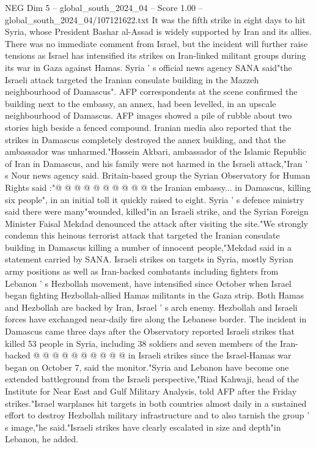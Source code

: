 \begin{textsample}{NEG Dim 5 – global\_south\_2024\_04 – Score 1.00 – global\_south\_2024\_04/107121622.txt}  \label{ex:f5_neg_114}
It was the fifth strike in eight days to hit Syria, whose President Bashar al-Assad is widely supported by Iran and its allies.
There was no immediate comment from Israel, but the incident will further raise tensions as Israel has intensified its strikes on Iran-linked militant groups during its war in Gaza against Hamas.
Syria ' s official news agency SANA said"the Israeli attack targeted the Iranian consulate building in the Mazzeh neighbourhood of Damascus".
AFP correspondents at the scene confirmed the building next to the embassy, an annex, had been levelled, in an upscale neighbourhood of Damascus.
AFP images showed a pile of rubble about two stories high beside a fenced compound.
Iranian media also reported that the strikes in Damascus completely destroyed the annex building, and that the ambassador was unharmed."Hossein Akbari, ambassador of the Islamic Republic of Iran in Damascus, and his family were not harmed in the Israeli attack,"Iran ' s Nour news agency said.
Britain-based group the Syrian Observatory for Human Rights said :"@ @ @ @ @ @ @ @ @ @ the Iranian embassy... in Damascus, killing six people", in an initial toll it quickly raised to eight.
Syria ' s defence ministry said there were many"wounded, killed"in an Israeli strike, and the Syrian Foreign Minister Faisal Mekdad denounced the attack after visiting the site."We strongly condemn this heinous terrorist attack that targeted the Iranian consulate building in Damascus killing a number of innocent people,"Mekdad said in a statement carried by SANA.
Israeli strikes on targets in Syria, mostly Syrian army positions as well as Iran-backed combatants including fighters from Lebanon ' s Hezbollah movement, have intensified since October when Israel began fighting Hezbollah-allied Hamas militants in the Gaza strip.
Both Hamas and Hezbollah are backed by Iran, Israel ' s arch enemy.
Hezbollah and Israeli forces have exchanged near-daily fire along the Lebanese border.
The incident in Damascus came three days after the Observatory reported Israeli strikes that killed 53 people in Syria, including 38 soldiers and seven members of the Iran-backed @ @ @ @ @ @ @ @ @ @ in Israeli strikes since the Israel-Hamas war began on October 7, said the monitor."Syria and Lebanon have become one extended battleground from the Israeli perspective,"Riad Kahwaji, head of the Institute for Near East and Gulf Military Analysis, told AFP after the Friday strikes."Israel warplanes hit targets in both countries almost daily in a sustained effort to destroy Hezbollah military infrastructure and to also tarnish the group ' s image,"he said."Israeli strikes have clearly escalated in size and depth"in Lebanon, he added.

\end{textsample}
